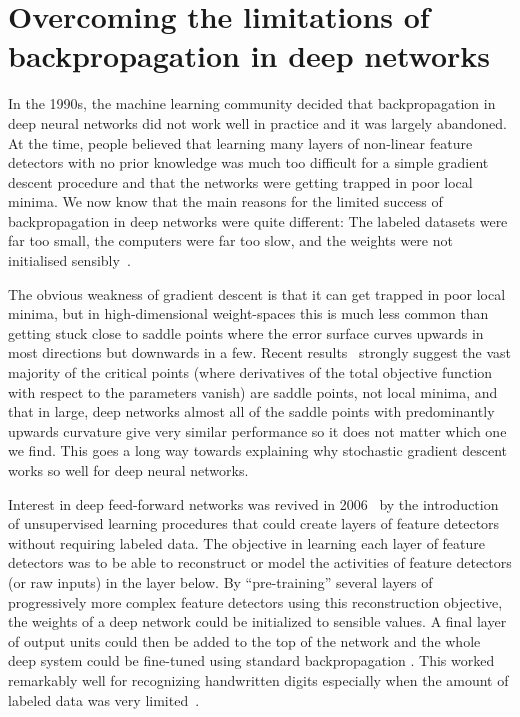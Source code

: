 \documentclass[10pts]{article}
\begin{document}
\section{Overcoming the limitations of backpropagation in deep networks}

In the 1990s, the machine learning community decided that backpropagation
in deep neural networks did not work well in practice and it was largely
abandoned.  At the time, people believed that learning many layers of
non-linear feature detectors with no prior knowledge was much too difficult
for a simple gradient descent procedure and that the networks were getting
trapped in poor local minima. We now know that the main reasons for the
limited success of backpropagation in deep networks were quite different:
The labeled datasets were far too small, the computers were far too slow,
and the weights were not initialised sensibly~\citep{GlorotAISTATS2010-small}.

The obvious weakness of gradient descent is that it can get trapped in poor
local minima, but in high-dimensional weight-spaces this is much less
common than getting stuck close to saddle points where the error surface
curves upwards in most directions but downwards in a few. Recent
results~\citep{Dauphin-et-al-NIPS2014-small,Choromanska-et-al-AISTATS2015} strongly suggest
the vast majority of the critical points (where derivatives of the total
objective function with respect to the parameters vanish) are saddle points, not
local minima, and that in large, deep networks almost all of the 
saddle points with predominantly upwards curvature  
give very similar performance so it does not matter which one we find.  This goes a long way
towards explaining why stochastic gradient descent works so well for deep
neural networks.

Interest in deep feed-forward networks was revived in
2006~\citep{IJCAI,Hinton06-small,Bengio-nips-2006-small,ranzato-07-small} 
by the introduction
of unsupervised learning procedures that could create layers of feature
detectors without requiring labeled data. The objective in learning each
layer of feature detectors was to be able to reconstruct or model the
activities of feature detectors (or raw inputs) in the layer below.  By
``pre-training'' several layers of progressively more complex feature
detectors using this reconstruction objective, the weights of a deep
network could be initialized to sensible values.  A final layer of output
units could then be added to the top of the network and the whole deep
system could be fine-tuned using standard
backpropagation \citep{Hinton-Science2006}. This worked remarkably well for recognizing
handwritten digits especially when the amount of labeled data was very
limited~\citep{Bengio-nips-2006-small,Erhan+al-2010-small}.
\end{document}
